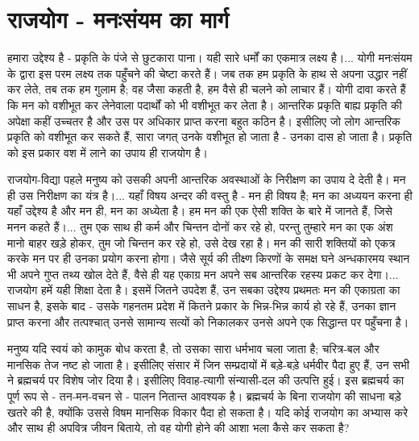 \vskip 3pt


\section*{राजयोग - मनःसंयम का मार्ग}


हमारा उद्देश्य है - प्रकृति के पंजे से छुटकारा पाना। यही सारे धर्मों का एकमात्र लक्ष्य है।... योगी मनःसंयम के द्वारा इस परम लक्ष्य तक पहुँचने की चेष्टा करते हैं। जब तक हम प्रकृति के हाथ से अपना उद्धार नहीं कर लेते, तब तक हम गुलाम है; वह जैसा कहती है, हम वैसे ही चलने को लाचार हैं। योगी दावा करते हैं कि मन को वशीभूत कर लेनेवाला पदार्थों को भी वशीभूत कर लेता है। आन्तरिक प्रकृति बाह्य प्रकृति की अपेक्षा कहीं उच्चतर है और उस पर अधिकार प्राप्त करना बहुत कठिन है। इसीलिए जो लोग आन्तरिक प्रकृति को वशीभूत कर सकते हैं, सारा जगत् उनके वशीभूत हो जाता है - उनका दास हो जाता है। प्रकृति को इस प्रकार वश में लाने का उपाय ही राजयोग है। 

\vskip 4pt

राजयोग-विद्या पहले मनुष्य को उसकी अपनी आन्तरिक अवस्थाओं के निरीक्षण का उपाय दे देती है। मन ही उस निरीक्षण का यंत्र है।... यहाँ विषय अन्दर की वस्तु है - मन ही विषय है; मन का अध्ययन करना ही यहाँ उद्देश्य है और मन ही, मन का अध्येता है। हम मन की एक ऐसी शक्ति के बारे में जानते हैं, जिसे मनन कहते हैं।... तुम एक साथ ही कर्म और चिन्तन दोनों कर रहे हो, परन्तु तुम्हारे मन का एक अंश मानो बाहर खड़े होकर, तुम जो चिन्तन कर रहे हो, उसे देख रहा है। मन की सारी शक्तियों को एकत्र करके मन पर ही उनका प्रयोग करना होगा। जैसे सूर्य की तीक्ष्ण किरणों के समक्ष घने अन्धकारमय स्थान भी अपने गुप्त तथ्य खोल देते हैं, वैसे ही यह एकाग्र मन अपने सब आन्तरिक रहस्य प्रकट कर देगा।... राजयोग हमें यही शिक्षा देता है। इसमें जितने उपदेश हैं, उन सबका उद्देश्य प्रथमतः मन की एकाग्रता का साधन है, इसके बाद - उसके गहनतम प्रदेश में कितने प्रकार के भिन्न-भिन्न कार्य हो रहे हैं, उनका ज्ञान प्राप्त करना और तत्पश्चात् उनसे सामान्य सत्यों को निकालकर उनसे अपने एक सिद्धान्त पर पहुँचना है। 

मनुष्य यदि स्वयं को कामुक बोध करता है, तो उसका सारा धर्मभाव चला जाता है; चरित्र-बल और मानसिक तेज नष्ट हो जाता है। इसीलिए संसार में जिन सम्प्रदायों में बड़े-बड़े धर्मवीर पैदा हुए हैं, उन सभी ने ब्रह्मचर्य पर विशेष जोर दिया है। इसीलिए विवाह-त्यागी संन्यासी-दल की उत्पत्ति हुई। इस ब्रह्मचर्य का पूर्ण रूप से - तन-मन-वचन से - पालन नितान्त आवश्यक है। ब्रह्मचर्य के बिना राजयोग की साधना बड़े खतरे की है, क्योंकि उससे विषम मानसिक विकार पैदा हो सकता है। यदि कोई राजयोग का अभ्यास करे और साथ ही अपवित्र जीवन बिताये, तो वह योगी होने की आशा भला कैसे कर सकता है?



